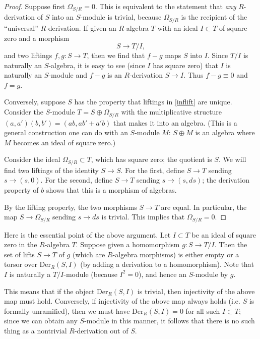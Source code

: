 \begin{proof} 
Suppose first $\Omega_{S/R}=0$. This is equivalent to the statement that
\emph{any} $R$-derivation of $S$ into an $S$-module is trivial, because
$\Omega_{S/R}$ is the recipient of the ``universal'' $R$-derivation.
If given an $R$-algebra $T$ with an ideal $I \subset T$ of square zero and a
morphism 
\[ S \to T/I,  \]
and two liftings $f,g: S \to T$, then we find that $f-g$ maps $S$ into $I$.
Since $T/I$ is naturally an $S$-algebra, it is easy to see (since $I$ has
square zero) that $I$ is naturally an $S$-module and $f-g$ is an
$R$-derivation $S \to I$. 
Thus $f-g \equiv 0$ and $f=g$.

Conversely, suppose $S$ has the property that liftings in \eqref{inflift} are
unique.
Consider the $S$-module $T=S \oplus \Omega_{S/R}$ with the multiplicative
structure $(a,a')(b,b') = (ab, ab' + a'b)$ that makes it into an algebra.
(This is a general construction one can do with an $S$-module $M$: $S \oplus
M$ is an algebra where $M$ becomes an ideal of square zero.)

Consider the ideal $\Omega_{S/R} \subset T$, which has
square zero; the quotient is $S$. We will find two liftings of the identity $S
\to S$. For the first, define $S \to T$ sending $s \to (s,0)$. For the second,
define $S \to T$ sending $s \to (s, ds)$; the derivation property of $b$ shows
that this is a morphism of algebras.

By the lifting property, the two morphisms $S \to T$ are equal. In particular,
the map $S \to \Omega_{S/R}$ sending $s \to ds$ is trivial. This implies that
$\Omega_{S/R}=0$.

\end{proof} 

Here is the essential point of the above argument. Let $I \subset T$ be an
ideal of square zero in the $R$-algebra $T$. 
Suppose given a homomorphism $g: S \to T/I$.
Then the set of lifts $S \to T$ of $g$ (which are $R$-algebra morphisms)
is either empty or a torsor over 
$\mathrm{Der}_R(S, I)$ (by adding a derivation to
a homomorphism). 
Note that $I$ is naturally a $T/I$-module (because $I^2 = 0$), and hence an
$S$-module by $g$.

This means that if the object $\mathrm{Der}_R(S, I)$ is trivial, then
injectivity of the above map must hold. 
Conversely, if injectivity of the above map always holds (i.e. $S$ is formally
unramified),
then we must have $\mathrm{Der}_R(S, I) = 0$ for all such $I \subset T$; since
we can obtain any $S$-module in this manner, it follows that there is no such
thing as  a nontrivial $R$-derivation out of $S$.


